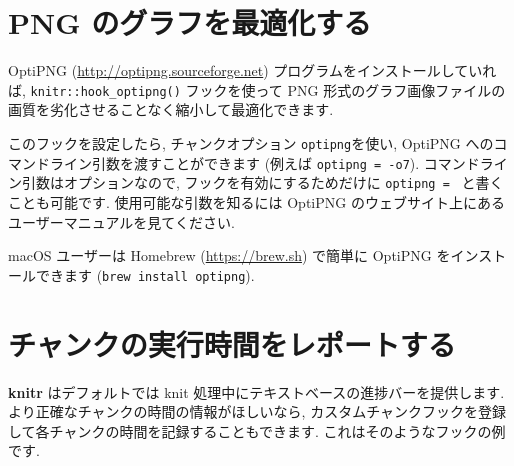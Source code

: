 \documentclass[
  11pt,
  lualatex,ja=standard,jafont=noto]{bxjsreport}
\newenvironment{Shaded}{\begin{snugshade}}{\end{snugshade}}
\newcommand{\AttributeTok}[1]{\textcolor[rgb]{0.77,0.63,0.00}{#1}}
\newcommand{\FunctionTok}[1]{\textcolor[rgb]{0.00,0.00,0.00}{#1}}
\newcommand{\NormalTok}[1]{#1}
\newcommand{\SpecialCharTok}[1]{\textcolor[rgb]{0.00,0.00,0.00}{#1}}
\begin{document}
\hypertarget{optipng}{%
\section{PNG のグラフを最適化する}\label{optipng}}

OptiPNG (\url{http://optipng.sourceforge.net}) プログラムをインストールしていれば, \texttt{knitr::hook\_optipng()} フックを使って PNG 形式のグラフ画像ファイルの画質を劣化させることなく縮小して最適化できます.

\begin{Shaded}
\end{Shaded}

このフックを設定したら, チャンクオプション \texttt{optipng}を使い, OptiPNG へのコマンドライン引数を渡すことができます (例えば \texttt{optipng = \textquotesingle{}-o7\textquotesingle{}}). コマンドライン引数はオプションなので, フックを有効にするためだけに \texttt{optipng = \textquotesingle{}\textquotesingle{}} と書くことも可能です. 使用可能な引数を知るには OptiPNG のウェブサイト上にあるユーザーマニュアルを見てください.

macOS ユーザーは Homebrew (\url{https://brew.sh}) で簡単に OptiPNG をインストールできます (\texttt{brew install optipng}).

\hypertarget{time-chunk}{%
\section{チャンクの実行時間をレポートする}\label{time-chunk}}

\textbf{knitr} はデフォルトでは knit 処理中にテキストベースの進捗バーを提供します. より正確なチャンクの時間の情報がほしいなら, カスタムチャンクフックを登録して各チャンクの時間を記録することもできます. これはそのようなフックの例です.
\end{document}
